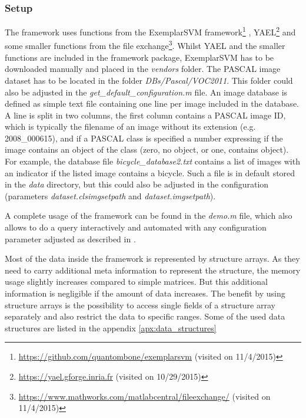 \subsubsection{Setup}

The framework uses functions from the ExemplarSVM framework\footnote{\url{https://github.com/quantombone/exemplarsvm} (visited on 11/4/2015)} \cite{Malisiewicz2011}, YAEL\footnote{\url{https://yael.gforge.inria.fr} (visited on 10/29/2015)} \cite{yael} and some smaller functions from the \MATLAB file exchange\footnote{\url{https://www.mathworks.com/matlabcentral/fileexchange/} (visited on 11/4/2015)}. Whilst YAEL and the smaller functions are included in the framework package, ExemplarSVM has to be downloaded manually and placed in the \textit{vendors} folder. The PASCAL image dataset has to be located in the folder \textit{DBs/Pascal/VOC2011}. This folder could also be adjusted in the \textit{get\_default\_configuration.m} file. An image database is defined as simple text file containing one line per image included in the database. A line is split in two columns, the first column contains a PASCAL image ID, which is typically the filename of an image without its extension (e.g. 2008\_000615), and if a PASCAL class is specified a number expressing if the image contains an object of the class (zero, no object, or one, contains object). For example, the database file \textit{bicycle\_database2.txt} contains a list of images with an indicator if the listed image contains a bicycle. Such a file is in default stored in the \textit{data} directory, but this could also be adjusted in the configuration (parameters \textit{dataset.clsimgsetpath} and \textit{dataset.imgsetpath}).

A complete usage of the framework can be found in the \textit{demo.m} file, which also allows to do a query interactively and automated with any configuration parameter adjusted as described in .

Most of the data inside the framework is represented by \MATLAB structure arrays. As they need to carry additional meta information to represent the structure, the memory usage slightly increases compared to simple matrices. But this additional information is negligible if the amount of data increases.
The benefit by using structure arrays is the possibility to access single fields of a structure array separately and also restrict the data to specific ranges. Some of the used data structures are listed in the appendix \ref{apx:data_structures}


